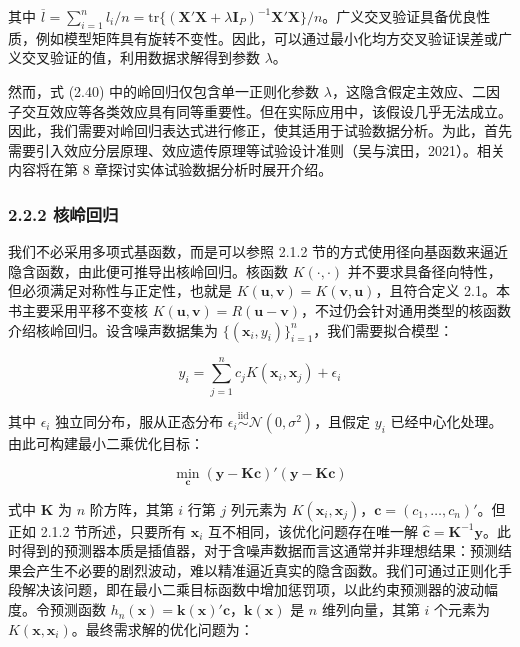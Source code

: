 \documentclass{ctexart}
\begin{document}
其中 $\overline{l}=\sum_{i=1}^{n}l_i/n=\mathrm{tr}\{(\boldsymbol{X}'\boldsymbol{X}+\lambda\boldsymbol{I}_P )^{-1}\boldsymbol{X}'\boldsymbol{X}\}/n$。广义交叉验证具备优良性质，例如模型矩阵具有旋转不变性。因此，可以通过最小化均方交叉验证误差或广义交叉验证的值，利用数据求解得到参数 $\lambda$。

然而，式 (2.40) 中的岭回归仅包含单一正则化参数 $\lambda$，这隐含假定主效应、二因子交互效应等各类效应具有同等重要性。但在实际应用中，该假设几乎无法成立。因此，我们需要对岭回归表达式进行修正，使其适用于试验数据分析。为此，首先需要引入效应分层原理、效应遗传原理等试验设计准则（吴与滨田，2021）。相关内容将在第 8 章探讨实体试验数据分析时展开介绍。

\subsubsection*{2.2.2 核岭回归}

我们不必采用多项式基函数，而是可以参照 2.1.2 节的方式使用径向基函数来逼近隐含函数，由此便可推导出核岭回归。核函数 $K(\cdot,\cdot)$ 并不要求具备径向特性，但必须满足对称性与正定性，也就是 $K(\boldsymbol{u},\boldsymbol{v})=K(\boldsymbol{v},\boldsymbol{u})$，且符合定义 2.1。本书主要采用平移不变核 $K(\boldsymbol{u},\boldsymbol{v})=R(\boldsymbol{u}-\boldsymbol{v})$，不过仍会针对通用类型的核函数介绍核岭回归。设含噪声数据集为 $\{(\boldsymbol{x}_i,y_i)\}_{i=1}^n$，我们需要拟合模型：

\begin{equation*}
y_i=\sum_{j=1}^n c_jK(\boldsymbol{x}_i,\boldsymbol{x}_j)+\epsilon_i
\end{equation*}

其中 $\epsilon_i$ 独立同分布，服从正态分布 $\epsilon_i\stackrel{\text{iid}}{\sim}\mathcal{N}(0,\sigma^2)$，且假定 $y_i$ 已经中心化处理。由此可构建最小二乘优化目标：

\begin{equation*}
\min_{\boldsymbol{c}}(\boldsymbol{y}-\boldsymbol{K}\boldsymbol{c})'(\boldsymbol{y}-\boldsymbol{K}\boldsymbol{c})
\end{equation*}

式中 $\boldsymbol{K}$ 为 $n$ 阶方阵，其第 $i$ 行第 $j$ 列元素为 $K(\boldsymbol{x}_i,\boldsymbol{x}_j)$，$\boldsymbol{c}=(c_1,\dots,c_n)'$。但正如 2.1.2 节所述，只要所有 $\boldsymbol{x}_i$ 互不相同，该优化问题存在唯一解 $\widehat{\boldsymbol{c}}=\boldsymbol{K}^{-1}\boldsymbol{y}$。此时得到的预测器本质是插值器，对于含噪声数据而言这通常并非理想结果：预测结果会产生不必要的剧烈波动，难以精准逼近真实的隐含函数。我们可通过正则化手段解决该问题，即在最小二乘目标函数中增加惩罚项，以此约束预测器的波动幅度。令预测函数 $h_n(\boldsymbol{x})=\boldsymbol{k}(\boldsymbol{x})'\boldsymbol{c}$，$\boldsymbol{k}(\boldsymbol{x})$ 是 $n$ 维列向量，其第 $i$ 个元素为 $K(\boldsymbol{x},\boldsymbol{x}_i)$。最终需求解的优化问题为：
\end{document}
